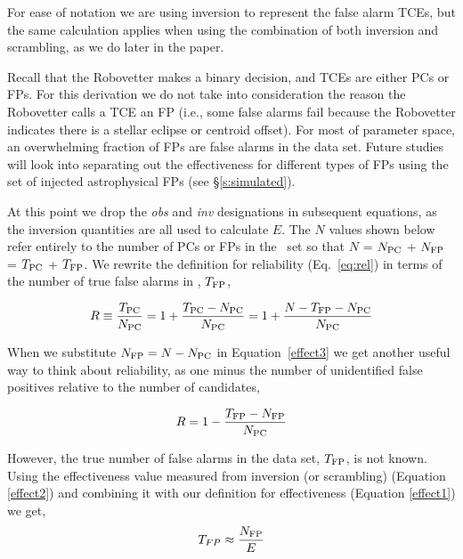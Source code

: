 For ease of notation we are using inversion to represent the false alarm TCEs, but the same calculation applies when using the combination of both inversion and scrambling, as we do later in the paper. 

{\color{blue}
Recall that the Robovetter makes a binary decision, and TCEs are either PCs or FPs. For this derivation we do not take into consideration the reason the Robovetter calls a TCE an FP (i.e., some false alarms fail because the Robovetter indicates there is a stellar eclipse or centroid offset). For most of parameter space, an overwhelming fraction of FPs are false alarms in the \opstce{} data set. Future studies will look into separating out the effectiveness for different types of FPs using the set of injected astrophysical FPs (see \S\ref{s:simulated}).
}

At this point we drop the \textit{obs} and \textit{inv} designations in subsequent equations, as the inversion quantities are all used to calculate $E$. The $N$ values shown below refer entirely to the number of PCs or FPs in the \opstce\ set so that $N$ = $N_{\rm PC}$ + $N_{\rm FP}$ = $T_{\rm PC}$ + $T_{\rm FP}$. We rewrite the definition for reliability (Eq.~\ref{eq:rel}) in terms of the number of true false alarms in \opstce, $T_{\rm FP}$,

\begin{equation}
\label{effect3}
R \equiv \frac{T_{\rm PC}}{N_{\rm PC}} =  1 + \frac{T_{\rm PC}-N_{\rm PC}}{N_{\rm PC}} 
= 1 + \frac{N - T_{\rm FP} - N_{\rm PC}}{N_{\rm PC}}
\end{equation}

\noindent When we substitute $N_{{\rm FP}}=N-N_{{\rm PC}}$ in Equation~\ref{effect3} we get another useful way to think about reliability, as one minus the number of unidentified false positives relative to the number of candidates,

\begin{equation}
\label{eq:rel2}
R = 1 - \frac{T_{\rm FP}-N_{\rm FP}}{N_{\rm PC}}
\end{equation}

\noindent However, the true number of false alarms in the \opstce{} data set, $T_{\rm FP}$, is not known. Using the effectiveness value measured from inversion (or scrambling) (Equation \ref{effect2}) and combining it with our definition for effectiveness (Equation \ref{effect1}) we get,
\begin{equation}
T_{FP} \approx \frac{N_{\rm FP}}{E} 
\end{equation}

